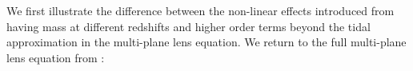 We first illustrate the difference between the non-linear effects introduced from having mass at different redshifts and higher order terms beyond the tidal approximation in the multi-plane lens equation. We return to the full multi-plane lens equation from \citet{PLW}: